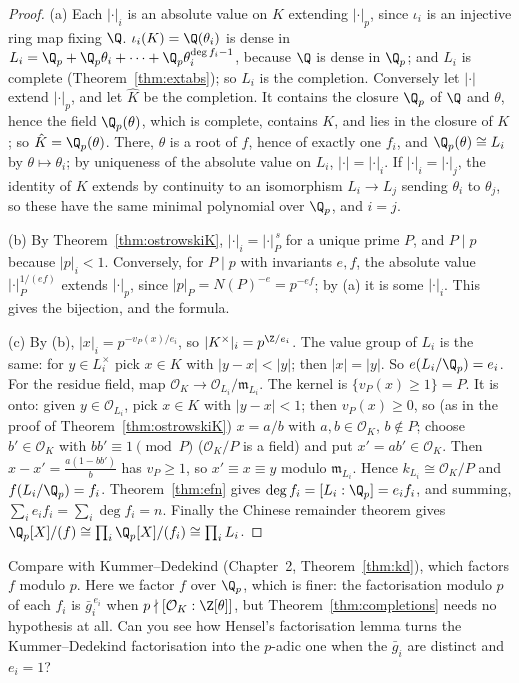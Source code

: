 \begin{proof}
(a) Each $|\cdot|_i$ is an absolute value on $K$ extending $|\cdot|_p$, since $\iota_i$ is an injective ring map fixing $\Q$.
$\iota_i(K)=\Q(\theta_i)$ is dense in $L_i=\Q_p+\Q_p\theta_i+\dots+\Q_p\theta_i^{\deg f_i-1}$, because $\Q$ is dense in $\Q_p$; and $L_i$
is complete (Theorem~\ref{thm:extabs}); so $L_i$ is the completion. Conversely let $|\cdot|$ extend $|\cdot|_p$, and let $\hat K$ be
the completion. It contains the closure $\Q_p$ of $\Q$ and $\theta$, hence the field $\Q_p(\theta)$, which is complete, contains
$K$, and lies in the closure of $K$; so $\hat K=\Q_p(\theta)$. There, $\theta$ is a root of $f$, hence of exactly one $f_i$, and
$\Q_p(\theta)\cong L_i$ by $\theta\mapsto\theta_i$; by uniqueness of the absolute value on $L_i$, $|\cdot|=|\cdot|_i$. If
$|\cdot|_i=|\cdot|_j$, the identity of $K$ extends by continuity to an isomorphism $L_i\to L_j$ sending $\theta_i$ to $\theta_j$, so
these have the same minimal polynomial over $\Q_p$, and $i=j$.

(b) By Theorem~\ref{thm:ostrowskiK}, $|\cdot|_i=|\cdot|_P^{\,s}$ for a unique prime $P$, and $P\mid p$ because $|p|_i<1$.
Conversely, for $P\mid p$ with invariants $e,f$, the absolute value $|\cdot|_P^{1/(ef)}$ extends $|\cdot|_p$, since $|p|_P=N(P)^{-e}=
p^{-ef}$; by (a) it is some $|\cdot|_i$. This gives the bijection, and the formula.

(c) By (b), $|x|_i=p^{-v_P(x)/e_i}$, so $|K^\times|_i=p^{\Z/e_i}$. The value group of $L_i$ is the same: for $y\in L_i^\times$ pick
$x\in K$ with $|y-x|<|y|$; then $|x|=|y|$. So $e(L_i/\Q_p)=e_i$. For the residue field, map $\mathcal O_K\to\mathcal O_{L_i}/\mathfrak
m_{L_i}$. The kernel is $\{v_P(x)\ge1\}=P$. It is onto: given $y\in\mathcal O_{L_i}$, pick $x\in K$ with $|y-x|<1$; then
$v_P(x)\ge0$, so (as in the proof of Theorem~\ref{thm:ostrowskiK}) $x=a/b$ with $a,b\in\mathcal O_K$, $b\notin P$; choose $b'\in\mathcal
O_K$ with $bb'\equiv1\pmod P$ ($\mathcal O_K/P$ is a field) and put $x'=ab'\in\mathcal O_K$. Then $x-x'=\frac{a(1-bb')}{b}$ has
$v_P\ge1$, so $x'\equiv x\equiv y$ modulo $\mathfrak m_{L_i}$. Hence $k_{L_i}\cong\mathcal O_K/P$ and $f(L_i/\Q_p)=f_i$.
Theorem~\ref{thm:efn} gives $\deg f_i=[L_i:\Q_p]=e_if_i$, and summing, $\sum_ie_if_i=\sum_i\deg f_i=n$. Finally the Chinese
remainder theorem gives $\Q_p[X]/(f)\cong\prod_i\Q_p[X]/(f_i)\cong\prod_iL_i$.
\end{proof}

\begin{think}
Compare with Kummer--Dedekind (Chapter~2, Theorem~\ref{thm:kd}), which factors $f$ modulo $p$. Here we factor $f$ over $\Q_p$,
which is finer: the factorisation modulo $p$ of each $f_i$ is $\bar g_i^{\,e_i}$ when $p\nmid[\mathcal O_K:\Z[\theta]]$, but Theorem~\ref{thm:completions}
needs no hypothesis at all. Can you see how Hensel's factorisation lemma turns the Kummer--Dedekind factorisation into the
$p$-adic one when the $\bar g_i$ are distinct and $e_i=1$?
\end{think}

